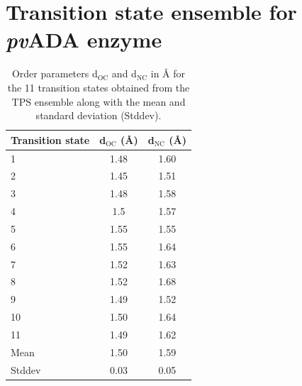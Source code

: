 \documentclass[journal=jpcbfk,manuscript=suppinfo,layout=traditional]{achemso}
\begin{document}
\section{Transition state ensemble for \textit{pv}ADA enzyme}
\begin{table}[ht!]
\caption{Order parameters d$_{\text{OC}}$ and d$_{\text{NC}}$ in {\AA} for the 11 transition states obtained from 
the TPS ensemble along with the mean and standard deviation (Stddev).}
\centering
\begin{tabular}{l c c}
\hline\hline
Transition state & d$_{\text{OC}}$ ({\AA})& d$_{\text{NC}}$ ({\AA})\\
\hline
1& 1.48  &1.60 \\
2& 1.45  &1.51 \\
3& 1.48  &1.58 \\
4& 1.5   &1.57 \\
5& 1.55  &1.55 \\
6& 1.55  &1.64 \\
7& 1.52  &1.63 \\
8& 1.52  &1.68 \\
9& 1.49  &1.52 \\
10&1.50  &1.64 \\
11&1.49  &1.62 \\
\hline
Mean & 1.50 & 1.59 \\
Stddev & 0.03 & 0.05 \\
\hline\hline
\end{tabular}
%
\end{table}


\end{document}

